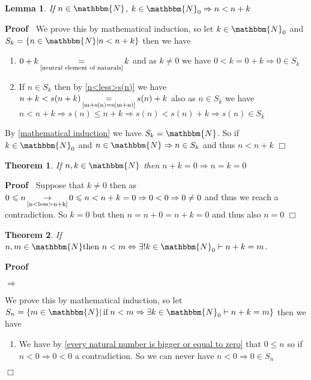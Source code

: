 \documentclass{book}
\newcommand{\Rightarrowlim}{\mathop{\rightarrow}\limits}
\newcommand{\equallim}{\mathop{=}\limits}
\newcommand{\nobracket}{}
\newcommand{\tmop}[1]{\ensuremath{\operatorname{#1}}}
\newcommand{\upl}{+}
\newenvironment{proof}{\noindent\textbf{Proof\ }}{\hspace*{\fill}$\Box$\medskip}
\newtheorem{lemma}{Lemma}
\newtheorem{theorem}{Theorem}
\begin{document}
{{\begin{lemma}
  \label{n<less>n+k}If $n \in \mathbbm{N}$, $k \in \mathbbm{N}_0 \Rightarrow n
  < n \upl k$
\end{lemma}

\begin{proof}
  We prove this by mathematical induction, so let $k \in \mathbbm{N}_0$ and
  $S_k = \{ n \in \mathbbm{N} | n < n \upl k \nobracket \}$ then we have
  \begin{enumerate}
    \item $0 \upl k \equallim_{\text{\ref{neutral element of naturals}}} k$
    and as $k \neq 0$ we have $0 < k = 0 \upl k \Rightarrow 0 \in S_k$
    
    \item If $n \in S_k$ then by \ref{n<less>s(n)} we have $n \upl k < s (n
    \upl k) \equallim_{\text{\ref{m+s(n)=s(m+n)}}} s (n) \upl k$ also as $n
    \in S_k$ we have $n < n \upl k \Rightarrow s (n) \leqslant n \upl k
    \Rightarrow s (n) < s (n) \upl k \Rightarrow s (n) \in S_k$
  \end{enumerate}
  By \ref{mathematical induction} we have $S_k =\mathbbm{N}$. So if $k \in
  \mathbbm{N}_0$ and $n \in \mathbbm{N} \Rightarrow n \in S_k$ and thus $n < n
  \upl k$
\end{proof}

\begin{theorem}
  \label{n+k=0=<gtr>n=k=0 if n,k are natural numbers}If $n, k \in \mathbbm{N}$
  then $n \upl k = 0 \Rightarrow n = k = 0$
\end{theorem}

\begin{proof}
  Suppose that $k \neq 0$ then as $0 \leqslant n
  \Rightarrowlim_{\text{\ref{n<less>n+k}}} 0 \leqslant n < n \upl k = 0
  \Rightarrow 0 < 0 \Rightarrow 0 \neq 0$ and thus we reach a contradiction.
  So $k = 0$ but then $n = n \upl 0 = n \upl k = 0$ and thus also $n = 0$
\end{proof}

\begin{theorem}
  \label{n<less>m=<gtr>n+k=m}If $n, m \in \mathbbm{N} \text{then } n < m
  \Leftrightarrow \exists !k \in \mathbbm{N}_0 \vdash n \upl k = m$.
\end{theorem}

\begin{proof}
  
  
  $\Rightarrow$
  
  We prove this by mathematical induction, so let $S_n = \{ m \in \mathbbm{N}
  | \tmop{if} n < m \Rightarrow \exists k \in \mathbbm{N}_0 \nobracket \vdash
  n \upl k = m \}$ then we have
  \begin{enumerate}
    \item We have by \ref{every natural number is bigger or equal to zero}
    that $0 \leqslant n$ so if $n < 0 \Rightarrow 0 < 0$ a contradiction. So
    we can never have $n < 0 \Rightarrow 0 \in S_n$
    

\end{enumerate}
\end{proof}}}
\end{document}
